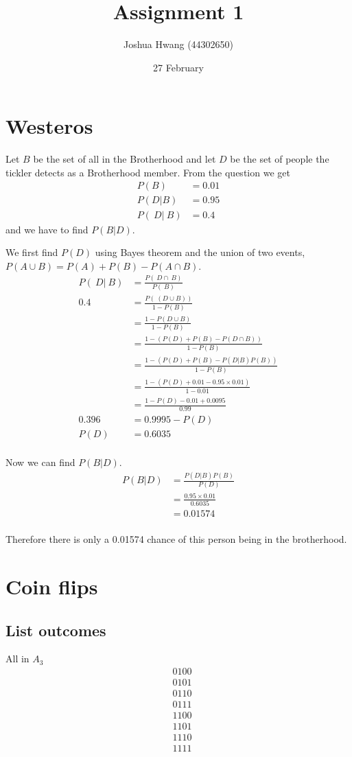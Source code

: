 \documentclass{article}
\title{Assignment 1}
\author{Joshua Hwang (44302650)}
\date{27 February}
\begin{document}
\maketitle
\section{Westeros}
Let $B$ be the set of all in the Brotherhood and let $D$ be the set of people
the tickler detects as a Brotherhood member. From the question we get
\begin{align*}
    P(B) &= 0.01 \\
    P(D|B) &= 0.95 \\
    P(~D|~B) &= 0.4
\end{align*}
and we have to find $P(B|D)$.

We first find $P(D)$ using Bayes theorem and the union of two events,
$P(A \cup B) = P(A) + P(B) - P(A \cap B)$.
\begin{align*}
    P(~D|~B) &= \frac{P(~D \cap ~B)}{P(~B)} \\
    0.4 &= \frac{P(~(D \cup B))}{1 - P(B)} \\
    &= \frac{1 - P(D \cup B)}{1 - P(B)} \\
    &= \frac{1 - (P(D) + P(B) - P(D \cap B))}{1 - P(B)} \\
    &= \frac{1 - (P(D) + P(B) - P(D|B)P(B))}{1 - P(B)} \\
    &= \frac{1 - (P(D) + 0.01 - 0.95 \times 0.01)}{1 - 0.01} \\
    &= \frac{1 - P(D) - 0.01 + 0.0095}{0.99} \\
    0.396 &= 0.9995 - P(D) \\
    P(D) &= 0.6035 \\
\end{align*}

Now we can find $P(B|D)$.
\begin{align*}
    P(B|D) &= \frac{P(D|B) P(B)}{P(D)} \\
    &= \frac{0.95 \times 0.01}{0.6035} \\
    &= 0.01574 \\
\end{align*}

Therefore there is only a 0.01574 chance of this person being in the
brotherhood.

\section{Coin flips}
\subsection{List outcomes}
All in $A_3$
\begin{align*}
    &0100 \\
    &0101 \\
    &0110 \\
    &0111 \\
    &1100 \\
    &1101 \\
    &1110 \\
    &1111 \\
\end{align*}
\end{document}
